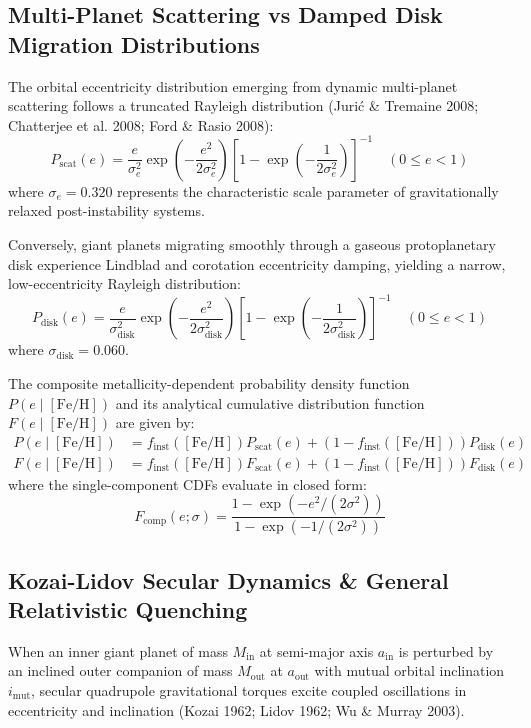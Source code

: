 \documentclass[11pt,a4paper]{article}
\begin{document}
\subsection{Multi-Planet Scattering vs Damped Disk Migration Distributions}
The orbital eccentricity distribution emerging from dynamic multi-planet scattering follows a truncated Rayleigh distribution (Juri{\'c} \& Tremaine 2008; Chatterjee et al. 2008; Ford \& Rasio 2008):
\begin{equation}
P_{\text{scat}}(e) = \frac{e}{\sigma_e^2} \exp\left(-\frac{e^2}{2\sigma_e^2}\right) \left[ 1 - \exp\left(-\frac{1}{2\sigma_e^2}\right) \right]^{-1} \quad (0 \le e < 1)
\label{eq:p_scat}
\end{equation}
where $\sigma_e = 0.320$ represents the characteristic scale parameter of gravitationally relaxed post-instability systems.

Conversely, giant planets migrating smoothly through a gaseous protoplanetary disk experience Lindblad and corotation eccentricity damping, yielding a narrow, low-eccentricity Rayleigh distribution:
\begin{equation}
P_{\text{disk}}(e) = \frac{e}{\sigma_{\text{disk}}^2} \exp\left(-\frac{e^2}{2\sigma_{\text{disk}}^2}\right) \left[ 1 - \exp\left(-\frac{1}{2\sigma_{\text{disk}}^2}\right) \right]^{-1} \quad (0 \le e < 1)
\label{eq:p_disk}
\end{equation}
where $\sigma_{\text{disk}} = 0.060$.

The composite metallicity-dependent probability density function $P(e \mid [\text{Fe/H}])$ and its analytical cumulative distribution function $F(e \mid [\text{Fe/H}])$ are given by:
\begin{align}
P(e \mid [\text{Fe/H}]) &= f_{\text{inst}}([\text{Fe/H}]) P_{\text{scat}}(e) + \left(1 - f_{\text{inst}}([\text{Fe/H}])\right) P_{\text{disk}}(e) \label{eq:pdf_comp} \\
F(e \mid [\text{Fe/H}]) &= f_{\text{inst}}([\text{Fe/H}]) F_{\text{scat}}(e) + \left(1 - f_{\text{inst}}([\text{Fe/H}])\right) F_{\text{disk}}(e) \label{eq:cdf_comp}
\end{align}
where the single-component CDFs evaluate in closed form:
\begin{equation}
F_{\text{comp}}(e; \sigma) = \frac{1 - \exp\left(-e^2 / (2\sigma^2)\right)}{1 - \exp\left(-1 / (2\sigma^2)\right)}
\label{eq:cdf_closed}
\end{equation}

\subsection{Kozai-Lidov Secular Dynamics \& General Relativistic Quenching}
When an inner giant planet of mass $M_{\text{in}}$ at semi-major axis $a_{\text{in}}$ is perturbed by an inclined outer companion of mass $M_{\text{out}}$ at $a_{\text{out}}$ with mutual orbital inclination $i_{\text{mut}}$, secular quadrupole gravitational torques excite coupled oscillations in eccentricity and inclination (Kozai 1962; Lidov 1962; Wu \& Murray 2003).
\end{document}
